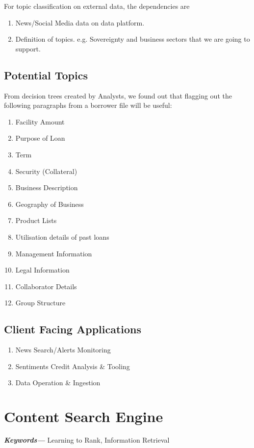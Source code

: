 \documentclass[]{article}
\providecommand{\keywords}[1]{\textbf{\textit{Keywords---}} #1}
\begin{document}
For topic classification on external data, the dependencies are

\begin{enumerate}
    \item News/Social Media data on data platform.
    \item Definition of topics. e.g. Sovereignty and business sectors that we 
    are going to support.
\end{enumerate}

\subsection{Potential Topics}

From decision trees created by Analysts, we found out that flagging out the 
following paragraphs from a borrower file will be useful:

\begin{enumerate}
    \item Facility Amount
    \item Purpose of Loan
    \item Term
    \item Security (Collateral)
    \item Business Description
    \item Geography of Business
    \item Product Lists
    \item Utilisation details of past loans
    \item Management Information
    \item Legal Information
    \item Collaborator Details
    \item Group Structure
\end{enumerate}

\subsection{Client Facing Applications}
\begin{enumerate}
    \item News Search/Alerts \textrightarrow Monitoring
    \item Sentiments \textrightarrow Credit Analysis \& Tooling
    \item Data Operation \& Ingestion
\end{enumerate}

\newpage

\section{Content Search Engine}
\keywords{Learning to Rank, Information Retrieval}
\end{document}
